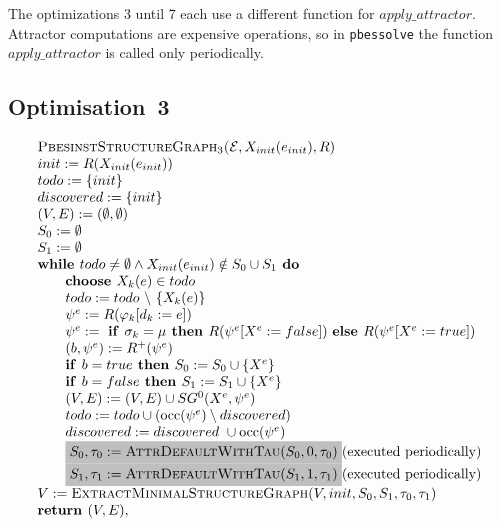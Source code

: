 \documentclass{article}
\newcommand{\Space}{\text{\ }}
\newcommand{\If}{\text{\textbf{if }}}
\newcommand{\Do}{\text{\textbf{ do }}}
\newcommand{\Then}{\text{\textbf{ then }}}
\newcommand{\Else}{\text{\textbf{else }}}
\newcommand{\While}{\text{\textbf{while }}}
\newcommand{\Choose}{\text{\textbf{choose }}}
\newcommand{\Return}{\text{\textbf{return }}}
\begin{document}
The optimizations 3 until 7 each use a different function for $apply\_attractor$. Attractor
computations are expensive operations, so in \texttt{pbessolve} the function $apply\_attractor$ is called only periodically.

\subsection{Optimisation~3}

\begin{equation*}
\begin{array}{l}
\textsc{PbesinstStructureGraph$_{3}$(}\mathcal{E}, X_{init}(e_{init}), R) \\ 
init:=R(X_{init}(e_{init})) \\
todo:=\{init\} \\
discovered:=\{init\} \\
(V,E) :=(\emptyset ,\emptyset ) \\ 
S_0:= \emptyset \\
S_1:= \emptyset \\
\While todo \neq \emptyset \wedge X_{init}(e_{init}) \notin S_0 \cup S_1 \Do \\ 
\qquad \Choose X_{k}(e)\in todo \\ 
\qquad todo:=todo\ \backslash \ \{X_{k}(e)\} \\ 
\qquad \psi ^{e}:=R(\varphi _{k}[d_{k}:=e]) \\ 
\qquad \psi^e := \Space \If \sigma_k = \mu \Then R(\psi^e[X^e := false])
\Space \Else R(\psi^e[X^e := true]) \\
\qquad (b,\psi^e) := R^+(\psi^e) \\
\qquad \If b = true \Then S_0 := S_0 \cup \{ X^e \}\\
\qquad \If b = false \Then S_1 := S_1 \cup \{ X^e \}\\
\qquad (V,E) := (V,E) \cup SG^{0}(X^{e},\psi ^{e}) \\ 
\qquad todo:=todo\cup (\mathrm{occ}(\psi ^{e})\setminus discovered) \\
\qquad discovered:=discovered\ \cup \mathrm{occ}(\psi ^{e}) \\
\qquad \colorbox{lightgray}{$S_0, \tau_0 := \textsc{AttrDefaultWithTau}(S_0, 0, \tau_0) $}
\text{(executed periodically)} \\
\qquad \colorbox{lightgray}{$S_1, \tau_1 := \textsc{AttrDefaultWithTau}(S_1, 1, \tau_1) $}
\text{(executed periodically)} \\
V := \textsc{ExtractMinimalStructureGraph}(V, init, S_0, S_1, \tau_0, \tau_1) \\
\Return(V, E),
\end{array}
\end{equation*}
\end{document}
